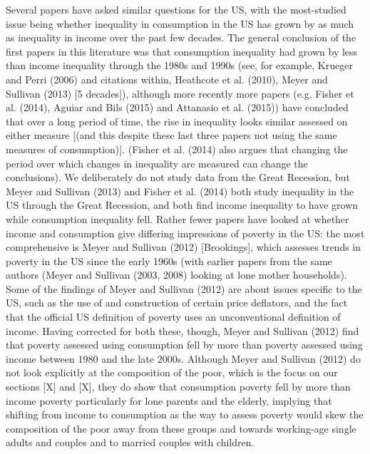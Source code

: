 Several papers have asked similar questions for the US, with the most-studied issue being whether inequality in consumption in the US has grown by as much as inequality in income over the past few decades. The general conclusion of the first papers in this literature was that consumption inequality had grown by less than income inequality through the 1980s and 1990s (see, for example, Krueger and Perri (2006) and citations within, Heathcote et al. (2010), Meyer and Sullivan (2013) [5 decades]), although more recently more papers (e.g. Fisher et al. (2014), Aguiar and Bils (2015) and Attanasio et al. (2015)) have concluded that over a long period of time, the rise in inequality looks similar assessed on either measure [(and this despite these last three papers not using the same measures of consumption)]. (Fisher et al. (2014) also argues that changing the period over which changes in inequality are measured can change the conclusions). We deliberately do not study data from the Great Recession, but Meyer and Sullivan (2013) and Fisher et al. (2014) both study inequality in the US through the Great Recession, and both find income inequality to have grown while consumption inequality fell. Rather fewer papers have looked at whether income and consumption give differing impressions of poverty in the US: the most comprehensive is Meyer and Sullivan (2012) [Brookings], which assesses trends in poverty in the US since the early 1960s (with earlier papers from the same authors (Meyer and Sullivan (2003, 2008) looking at lone mother households). Some of the findings of Meyer and Sullivan (2012) are about issues specific to the US, such as the use of and construction of certain price deflators, and the fact that the official US definition of poverty uses an unconventional definition of income. Having corrected for both these, though, Meyer and Sullivan (2012) find that poverty assessed using consumption fell by more than poverty assessed using income between 1980 and the late 2000s. Although Meyer and Sullivan (2012) do not look explicitly at the composition of the poor, which is the focus on our sections [X] and [X], they do show that consumption poverty fell by more than income poverty particularly for lone parents and the elderly, implying that shifting from income to consumption as the way to assess poverty would skew the composition of the poor away from these groups and towards working-age single adults and couples and to married couples with children.

